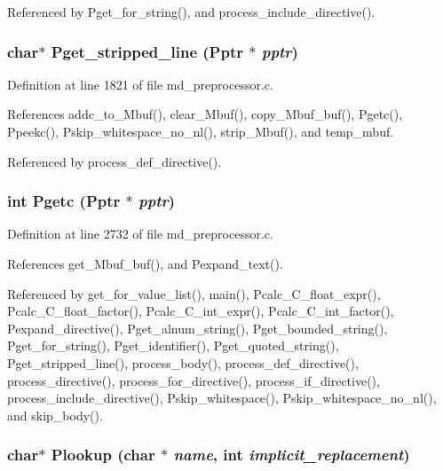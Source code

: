 Referenced by Pget\_\-for\_\-string(), and process\_\-include\_\-directive().
\subsubsection{\setlength{\rightskip}{0pt plus 5cm}char$\ast$ Pget\_\-stripped\_\-line (\bf{Pptr} $\ast$ {\em pptr})}\label{md__preprocessor_8c_d3ce20c32087bcde00f8e7d94653ddde}




Definition at line 1821 of file md\_\-preprocessor.c.

References addc\_\-to\_\-Mbuf(), clear\_\-Mbuf(), copy\_\-Mbuf\_\-buf(), Pgetc(), Ppeekc(), Pskip\_\-whitespace\_\-no\_\-nl(), strip\_\-Mbuf(), and temp\_\-mbuf.

Referenced by process\_\-def\_\-directive().
\subsubsection{\setlength{\rightskip}{0pt plus 5cm}int Pgetc (\bf{Pptr} $\ast$ {\em pptr})}\label{md__preprocessor_8c_b8460f9e0b884163e92dad174040ead0}




Definition at line 2732 of file md\_\-preprocessor.c.

References get\_\-Mbuf\_\-buf(), and Pexpand\_\-text().

Referenced by get\_\-for\_\-value\_\-list(), main(), Pcalc\_\-C\_\-float\_\-expr(), Pcalc\_\-C\_\-float\_\-factor(), Pcalc\_\-C\_\-int\_\-expr(), Pcalc\_\-C\_\-int\_\-factor(), Pexpand\_\-directive(), Pget\_\-alnum\_\-string(), Pget\_\-bounded\_\-string(), Pget\_\-for\_\-string(), Pget\_\-identifier(), Pget\_\-quoted\_\-string(), Pget\_\-stripped\_\-line(), process\_\-body(), process\_\-def\_\-directive(), process\_\-directive(), process\_\-for\_\-directive(), process\_\-if\_\-directive(), process\_\-include\_\-directive(), Pskip\_\-whitespace(), Pskip\_\-whitespace\_\-no\_\-nl(), and skip\_\-body().
\subsubsection{\setlength{\rightskip}{0pt plus 5cm}char$\ast$ Plookup (char $\ast$ {\em name}, int {\em implicit\_\-replacement})}\label{md__preprocessor_8c_8ac3ceff2e23da42c21150cfc5d3ff21}




